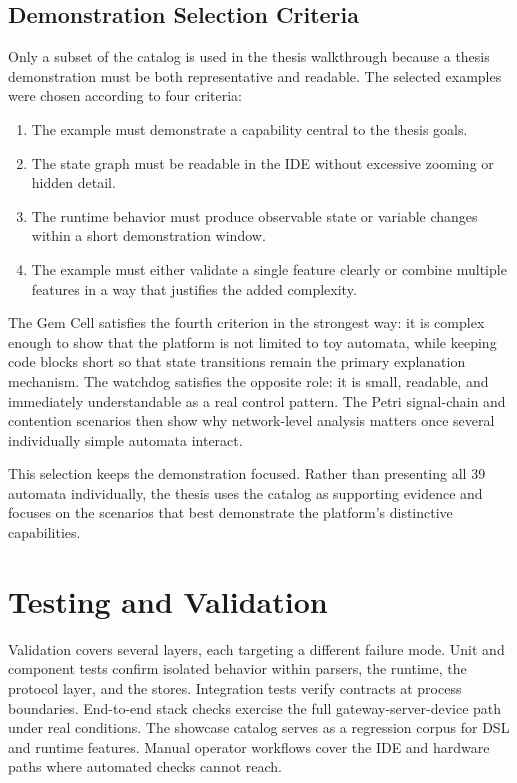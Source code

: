 \section{Demonstration Selection Criteria}
\label{sec:showcase-selection}

Only a subset of the catalog is used in the thesis walkthrough because a thesis demonstration must be both representative and readable. The selected examples were chosen according to four criteria:

\begin{enumerate}
  \item The example must demonstrate a capability central to the thesis goals.
  \item The state graph must be readable in the IDE without excessive zooming or hidden detail.
  \item The runtime behavior must produce observable state or variable changes within a short demonstration window.
  \item The example must either validate a single feature clearly or combine multiple features in a way that justifies the added complexity.
\end{enumerate}

The Gem Cell satisfies the fourth criterion in the strongest way: it is complex enough to show that the platform is not limited to toy automata, while keeping code blocks short so that state transitions remain the primary explanation mechanism. The watchdog satisfies the opposite role: it is small, readable, and immediately understandable as a real control pattern. The Petri signal-chain and contention scenarios then show why network-level analysis matters once several individually simple automata interact.

This selection keeps the demonstration focused. Rather than presenting all 39 automata individually, the thesis uses the catalog as supporting evidence and focuses on the scenarios that best demonstrate the platform's distinctive capabilities.

\chapter{Testing and Validation}
\label{chap:validation}

Validation covers several layers, each targeting a different failure mode. Unit and component tests confirm isolated behavior within parsers, the runtime, the protocol layer, and the stores. Integration tests verify contracts at process boundaries. End-to-end stack checks exercise the full gateway-server-device path under real conditions. The showcase catalog serves as a regression corpus for DSL and runtime features. Manual operator workflows cover the IDE and hardware paths where automated checks cannot reach.

